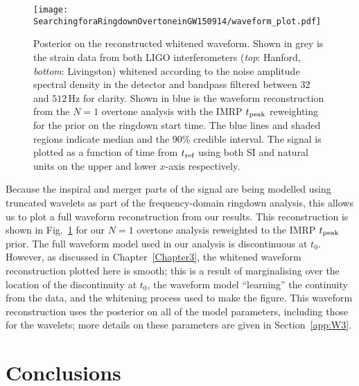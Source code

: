 \begin{figure}[t]
    \centering
    \texttt{[image: SearchingforaRingdownOvertoneinGW150914/waveform\_plot.pdf]}
    \caption[Whitened waveform reconstructions for GW150914]{ 
    Posterior on the reconstructed whitened waveform.
    Shown in grey is the strain data from both LIGO interferometers (\emph{top}: Hanford, \emph{bottom}: Livingston) whitened according to the noise amplitude spectral density in the detector and bandpass filtered between 32 and $512\,\mathrm{Hz}$ for clarity.
    Shown in blue is the waveform reconstruction from the $N=1$ overtone analysis with the IMRP $t_{\rm peak}$ reweighting for the prior on the ringdown start time.
    The blue lines and shaded regions indicate median and the 90\% credible interval. 
    The signal is plotted as a function of time from $t_{\rm ref}$ using both SI and natural units on the upper and lower $x$-axis respectively.
    }
    \label{fig:waveform}
\end{figure}

Because the inspiral and merger parts of the signal are being modelled using truncated wavelets as part of the frequency-domain ringdown analysis, this allows us to plot a full waveform reconstruction from our results.
This reconstruction is shown in Fig.~\ref{fig:waveform} for our $N=1$ overtone analysis reweighted to the IMRP $t_{\rm peak}$ prior.
The full waveform model used in our analysis is discontinuous at $t_0$. However, as discussed in Chapter~\ref{Chapter3}, the whitened waveform reconstruction plotted here is smooth; this is a result of marginalising over the location of the discontinuity at $t_0$, the waveform model ``learning'' the continuity from the data, and the whitening process used to make the figure.
This waveform reconstruction uses the posterior on all of the model parameters, including those for the wavelets; more details on these parameters are given in Section~\ref{app:W3}.


\section{Conclusions}\label{ch4:sec:discussion}

